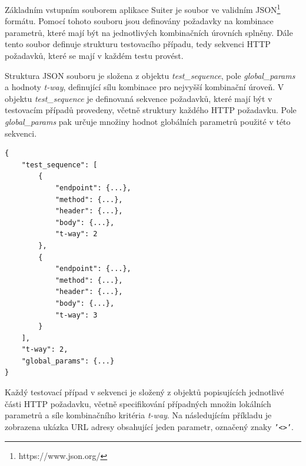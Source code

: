 
Základním vstupním souborem aplikace Suiter je soubor ve validním JSON\footnote{https://www.json.org/} formátu. Pomocí tohoto souboru jsou definovány požadavky na kombinace parametrů, které mají být na jednotlivých kombinačních úrovních splněny. Dále tento soubor definuje strukturu testovacího případu, tedy sekvenci HTTP požadavků, které se mají v každém testu provést. 
 
Struktura JSON souboru je složena z objektu \textit{test\_sequence}, pole \textit{global\_params} a hodnoty \textit{t-way}, definující sílu kombinace pro nejvyšší kombinační úroveň. V objektu \textit{test\_sequence} je definovaná sekvence požadavků, které mají být v testovacím případů provedeny, včetně struktury každého HTTP požadavku. Pole \textit{global\_params} pak určuje množiny hodnot globálních parametrů použité v této sekvenci.

\begin{lstlisting}[language={json2}]
{
	"test_sequence": [
		{
			"endpoint": {...},
			"method": {...},
			"header": {...},
			"body": {...},
			"t-way": 2
		},
		{
			"endpoint": {...},
			"method": {...},
			"header": {...},
			"body": {...},
			"t-way": 3
		}
	],
	"t-way": 2,
	"global_params": {...}
}
\end{lstlisting}

Každý testovací případ v sekvenci je složený z objektů popisujících jednotlivé části HTTP požadavku, včetně specifikování případných množin lokálních parametrů a síle kombinačního kritéria \textit{t-way}. Na následujícím příkladu je zobrazena ukázka URL adresy obsahující jeden parametr, označený znaky \texttt{'<>'}.

